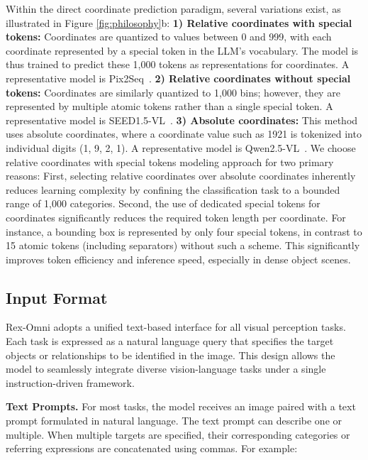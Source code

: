Within the direct coordinate prediction paradigm, several variations exist, as illustrated in Figure \ref{fig:philosophy}b:
\textbf{1) Relative coordinates with special tokens:} Coordinates are quantized to values between 0 and 999, with each coordinate represented by a special token in the LLM's vocabulary. The model is thus trained to predict these 1,000 tokens as representations for coordinates. A representative model is Pix2Seq~\cite{chen2021pix2seq}.
\textbf{2) Relative coordinates without special tokens:} Coordinates are similarly quantized to 1,000 bins; however, they are represented by multiple atomic tokens rather than a single special token. A representative model is SEED1.5-VL~\cite{guo2025seed1}.
\textbf{3) Absolute coordinates:} This method uses absolute coordinates, where a coordinate value such as 1921 is tokenized into individual digits (1, 9, 2, 1).  A representative model is Qwen2.5-VL~\cite{bai2025qwen2}. We choose relative coordinates with special tokens modeling approach for two primary reasons: First, selecting relative coordinates over absolute coordinates inherently reduces learning complexity by confining the classification task to a bounded range of 1,000 categories. Second, the use of dedicated special tokens for coordinates significantly reduces the required token length per coordinate. For instance, a bounding box is represented by only four special tokens, in contrast to 15 atomic tokens (including separators) without such a scheme. This significantly improves token efficiency and inference speed, especially in dense object scenes.

\subsection{Input Format}

Rex-Omni adopts a unified text-based interface for all visual perception tasks. Each task is expressed as a natural language query that specifies the target objects or relationships to be identified in the image. This design allows the model to seamlessly integrate diverse vision-language tasks under a single instruction-driven framework.

\vspace{0.3em}
\noindent\textbf{Text Prompts.}  
For most tasks, the model receives an image paired with a text prompt formulated in natural language. The text prompt can describe one or multiple. When multiple targets are specified, their corresponding categories or referring expressions are concatenated using commas. For example:

